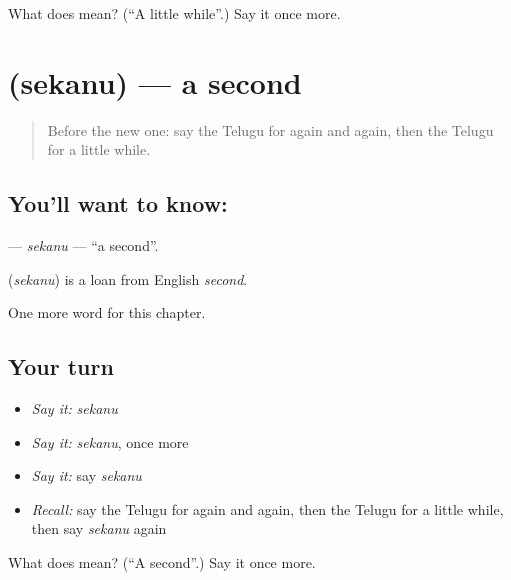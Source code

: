 \begin{tcolorbox}[breakable,colback=teal!4,colframe=teal!35!black,title={Before you move on}]
What does  mean? (\textquotedblleft{}A little while\textquotedblright{}.) Say it once more.
\end{tcolorbox}
\section[\texorpdfstring{\te{సెకను} (sekanu)}{సెకను (sekanu)}]{ (sekanu) — a second}

\label{lesson:TE-C213-sekanu}



\begin{quote}
Before the new one: say the Telugu for again and again, then the Telugu for a little while.
\end{quote}

\subsection*{You'll want to know: }
\textbf{} — \emph{sekanu} — \textquotedblleft{}a second\textquotedblright{}.

\begin{cousinweb}
\textbf{} (\emph{sekanu}) is a loan from English \emph{second}.
\end{cousinweb}

\begin{grammarlens}[title={What you've built}]
One more word for this chapter.
\end{grammarlens}

\subsection*{Your turn}
\begin{itemize}
\raggedright
  \item \emph{Say it:} \emph{sekanu}
  \item \emph{Say it:} \emph{sekanu}, once more
  \item \emph{Say it:} say \emph{sekanu}
  \item \emph{Recall:} say the Telugu for again and again, then the Telugu for a little while, then say \emph{sekanu} again
\end{itemize}

\begin{tcolorbox}[breakable,colback=teal!4,colframe=teal!35!black,title={Before you move on}]
What does  mean? (\textquotedblleft{}A second\textquotedblright{}.) Say it once more.
\end{tcolorbox}
